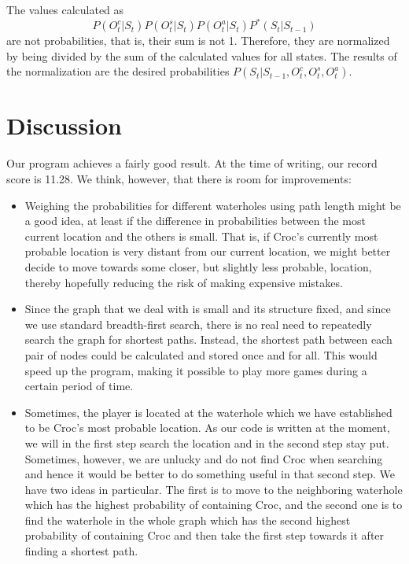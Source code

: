 \documentclass[a4paper]{article}
\begin{document}
The values calculated as
\begin{equation*}
  P(O^c_t|S_t)P(O^s_t|S_t)P(O^a_t|S_t)P^*(S_t|S_{t-1})
\end{equation*}
are not probabilities, that is, their sum is not 1. Therefore, they are
normalized by being divided by the sum of the calculated values for all
states. The results of the normalization are the desired probabilities $P(S_t|S_{t-1}, O^c_t, O^s_t, O^a_t)$.

\section{Discussion}

Our program achieves a fairly good result. At the time of writing, our
record score is 11.28. We think, however, that there is room for improvements:
\begin{itemize}
\item Weighing the probabilities for different waterholes using path length
  might be a good idea, at least if the difference in probabilities between
  the most current location and the others is small. That is, if Croc's currently most probable location is
  very distant from our current location, we might better decide to move
  towards some closer, but slightly less probable, location, thereby hopefully
  reducing the risk of making expensive mistakes.
\item Since the graph that we deal with is small and its structure fixed, and since we use standard breadth-first
  search, there is no real need to repeatedly search the graph for shortest
  paths. Instead, the shortest path between each pair of nodes could be
  calculated and stored once and for all. This would speed up the program,
  making it possible to play more games during a certain period of time.
  \item Sometimes, the player is located at the waterhole which we have established to be Croc's most probable location.
  As our code is written at the moment, we will in the first step search the
  location and in the second step stay put. Sometimes, however, we are unlucky and do not find Croc when searching and hence it would be better to do something useful
  in that second step. We have two ideas in particular. The first is to move to the neighboring waterhole 
  which has the highest probability of containing Croc, and the second one
  is to find the waterhole in the whole graph which has the second highest probability of containing Croc and then take the first step towards it after finding 
  a shortest path.
\end{itemize}
\end{document}
